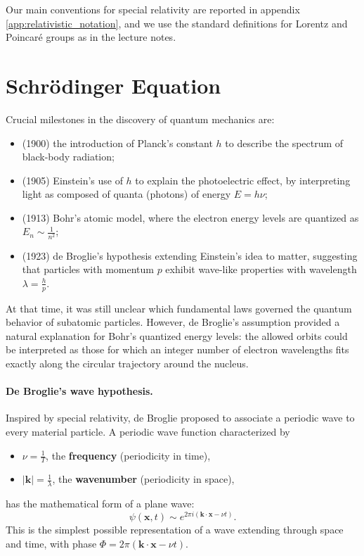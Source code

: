 Our main conventions for special relativity are reported in appendix \ref{app:relativistic_notation}, and we use the standard definitions for Lorentz and Poincar\'e groups as in the lecture notes.

\section{Schrödinger Equation}

Crucial milestones in the discovery of quantum mechanics are:

\begin{itemize}
    \item (1900) the introduction of Planck’s constant $h$ to describe the spectrum of black-body radiation;
    \item (1905) Einstein’s use of $h$ to explain the photoelectric effect, by interpreting light as composed of quanta (photons) of energy $E = h\nu$;
    \item (1913) Bohr’s atomic model, where the electron energy levels are quantized as $E_n \sim \frac{1}{n^2}$;
    \item (1923) de Broglie’s hypothesis extending Einstein’s idea to matter, suggesting that particles with momentum $p$ exhibit wave-like properties with wavelength $\lambda = \frac{h}{p}$.
\end{itemize}

At that time, it was still unclear which fundamental laws governed the quantum behavior of subatomic particles. However, de Broglie’s assumption provided a natural explanation for Bohr’s quantized energy levels: the allowed orbits could be interpreted as those for which an integer number of electron wavelengths fits exactly along the circular trajectory around the nucleus.

\paragraph{De Broglie’s wave hypothesis.}
Inspired by special relativity, de Broglie proposed to associate a periodic wave to every material particle. A periodic wave function characterized by
\begin{itemize}
    \item $\nu = \frac{1}{T}$, the \textbf{frequency} (periodicity in time),
    \item $|\mathbf{k}| = \frac{1}{\lambda}$, the \textbf{wavenumber} (periodicity in space),
\end{itemize}
has the mathematical form of a plane wave:
\[
    \psi(\mathbf{x},t) \sim e^{2\pi i(\mathbf{k}\cdot\mathbf{x} - \nu t)}.
\]
This is the simplest possible representation of a wave extending through space and time, with phase $\Phi = 2\pi(\mathbf{k}\cdot\mathbf{x} - \nu t)$.


